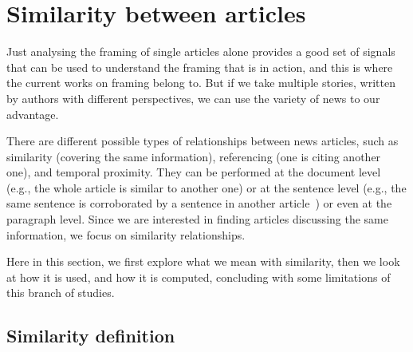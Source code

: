 \section{Similarity between articles}
\label{sec:lit_relationships}

Just analysing the framing of single articles alone provides a good set of signals that can be used to understand the framing that is in action, and this is where the current works on framing belong to. But if we take multiple stories, written by authors with different perspectives, we can use the variety of news to our advantage.


There are different possible types of relationships between news articles, such as similarity (covering the same information), referencing (one is citing another one), and temporal proximity. They can be performed at the document level (e.g., the whole article is similar to another one) or at the sentence level (e.g., the same sentence is corroborated by a sentence in another article~\cite{bountouridis2018explaining}) or even at the paragraph level.
Since we are interested in finding articles discussing the same information, we focus on similarity relationships.

Here in this section, we first explore what we mean with similarity, then we look at how it is used, and how it is computed, concluding with some limitations of this branch of studies.

\subsection{Similarity definition}

